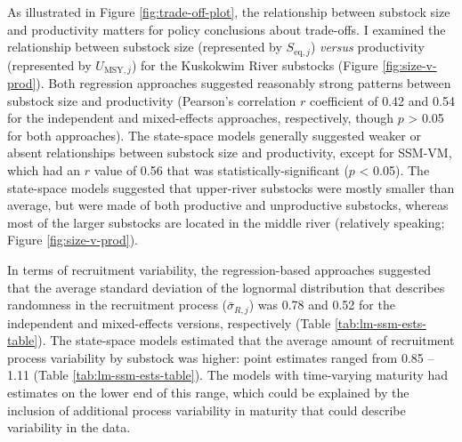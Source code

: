 \documentclass[12pt,]{book}
\theoremstyle{definition}
\theoremstyle{definition}
\theoremstyle{definition}
\theoremstyle{remark}
\begin{document}
As illustrated in Figure \ref{fig:trade-off-plot}, the relationship
between substock size and productivity matters for policy conclusions
about trade-offs. I examined the relationship between substock size
(represented by \(S_{\text{eq},j}\)) \emph{versus} productivity
(represented by \(U_{\text{MSY},j}\)) for the Kuskokwim River substocks
(Figure \ref{fig:size-v-prod}). Both regression approaches suggested
reasonably strong patterns between substock size and productivity
(Pearson's correlation \(r\) coefficient of 0.42 and 0.54 for the
independent and mixed-effects approaches, respectively, though \(p\)
\textgreater{} 0.05 for both approaches). The state-space models
generally suggested weaker or absent relationships between substock size
and productivity, except for SSM-VM, which had an \(r\) value of 0.56
that was statistically-significant (\(p\) \textless{} 0.05). The
state-space models suggested that upper-river substocks were mostly
smaller than average, but were made of both productive and unproductive
substocks, whereas most of the larger substocks are located in the
middle river (relatively speaking; Figure \ref{fig:size-v-prod}).

In terms of recruitment variability, the regression-based approaches
suggested that the average standard deviation of the lognormal
distribution that describes randomness in the recruitment process
(\(\bar{\sigma}_{R,j}\)) was 0.78 and 0.52 for the independent and
mixed-effects versions, respectively (Table
\ref{tab:lm-ssm-ests-table}). The state-space models estimated that the
average amount of recruitment process variability by substock was
higher: point estimates ranged from 0.85 -- 1.11 (Table
\ref{tab:lm-ssm-ests-table}). The models with time-varying maturity had
estimates on the lower end of this range, which could be explained by
the inclusion of additional process variability in maturity that could
describe variability in the data.
\end{document}
